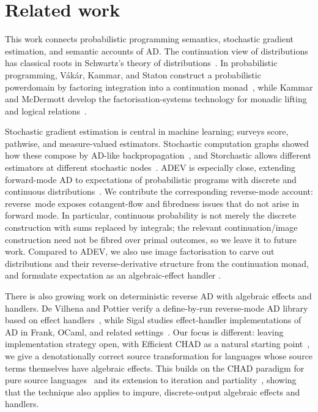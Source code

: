 \documentclass[11pt,a4paper]{article}
\theoremstyle{definition}
\theoremstyle{remark}
\begin{document}
\section{Related work}
\label{sec:related-work}

This work connects probabilistic programming semantics, stochastic gradient
estimation, and semantic accounts of AD. The continuation view of distributions
has classical roots in Schwartz's theory of distributions~\cite{schwartzTheorieDistributions1950}.
In probabilistic programming, Vákár, Kammar, and Staton construct a
probabilistic powerdomain by factoring integration into a continuation
monad~\cite{vakarDomainTheoryStatistical2019}, while Kammar and McDermott
develop the factorisation-systems technology for monadic lifting and logical
relations~\cite{kammarFactorisationSystemsLogical2018}.

Stochastic gradient estimation is central in machine learning;
\cite{mohamedMonteCarloGradient2020} surveys score, pathwise, and
measure-valued estimators. Stochastic computation graphs showed how these
compose by AD-like backpropagation~\cite{schulmanGradientEstimationUsing2015},
and Storchastic allows different estimators at different stochastic
nodes~\cite{vankriekenStorchasticFrameworkGeneral2021}. ADEV is especially
close, extending forward-mode AD to expectations of probabilistic programs
with discrete and continuous distributions~\cite{lewADEVSoundAutomatic2023}.
We contribute the corresponding reverse-mode account: reverse~mode
exposes cotangent-flow and fibredness issues that do not arise
in forward mode. In particular, continuous probability is not merely the
discrete construction with sums replaced by integrals; the relevant
continuation/image construction need not be fibred over primal outcomes, so we
leave it to future work. Compared to ADEV, we also use image factorisation to
carve out distributions and their reverse-derivative structure from the
continuation monad, and formulate expectation as an algebraic-effect handler
\cite{plotkinAlgebraicOperationsGeneric2003,plotkinHandlingAlgebraicEffects2013}.

There is also growing work on deterministic reverse AD with algebraic effects
and handlers. De Vilhena and Pottier verify a define-by-run reverse-mode AD
library based on effect handlers~\cite{devilhenaVerifyingEffectHandlerBased2023},
while Sigal studies effect-handler implementations of AD in Frank, OCaml, and
related settings~\cite{sigalAutomaticDifferentiationEffects2021,sigalAutomaticDifferentiationEffects2024}.
Our focus is different: leaving implementation strategy open, with Efficient
CHAD as a natural starting point~\cite{smedingEfficientCHAD2024}, we give a
denotationally correct source transformation for languages whose source terms
themselves have algebraic effects. This builds on the CHAD paradigm for pure
source languages~\cite{vakarReverseADHigher2021,vakarCHADCombinatoryHomomorphic2022,lucatellinunesCHADExpressiveTotal2023}
and its extension to iteration and partiality~\cite{lucatellinunesUnravelingIterativeCHAD2025},
showing that the technique also applies to impure, discrete-output algebraic
effects and handlers.
\end{document}
